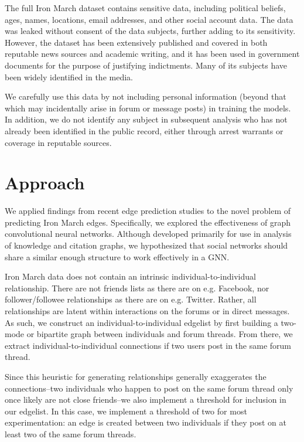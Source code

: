\documentclass[10pt,twocolumn,letterpaper]{article}
\begin{document}
The full Iron March dataset contains sensitive data, including political beliefs, ages, names, locations, email addresses, and other social account data. The data was leaked without consent of the data subjects, further adding to its sensitivity. However, the dataset has been extensively published and covered in both reputable news sources and academic writing, and it has been used in government documents for the purpose of justifying indictments. Many of its subjects have been widely identified in the media. 

We carefully use this data by not including personal information (beyond that which may incidentally arise in forum or message posts) in training the models. In addition, we do not identify any subject in subsequent analysis who has not already been identified in the public record, either through arrest warrants or coverage in reputable sources.

\section{Approach}

We applied findings from recent edge prediction studies to the novel problem of predicting Iron March edges. Specifically, we explored the effectiveness of graph convolutional neural networks. Although developed primarily for use in analysis of knowledge and citation graphs, we hypothesized that social networks should share a similar enough structure to work effectively in a GNN. 

Iron March data does not contain an intrinsic individual-to-individual relationship. There are not friends lists as there are on e.g. Facebook, nor follower/followee relationships as there are on e.g. Twitter. Rather, all relationships are latent within interactions on the forums or in direct messages. As such, we construct an individual-to-individual edgelist by first building a two-mode or bipartite graph between individuals and forum threads. From there, we extract individual-to-individual connections if two users post in the same forum thread.

Since this heuristic for generating relationships generally exaggerates the connections--two individuals who happen to post on the same forum thread only once likely are not close friends--we also implement a threshold for inclusion in our edgelist. In this case, we implement a threshold of two for most experimentation: an edge is created between two individuals if they post on at least two of the same forum threads.
\end{document}
